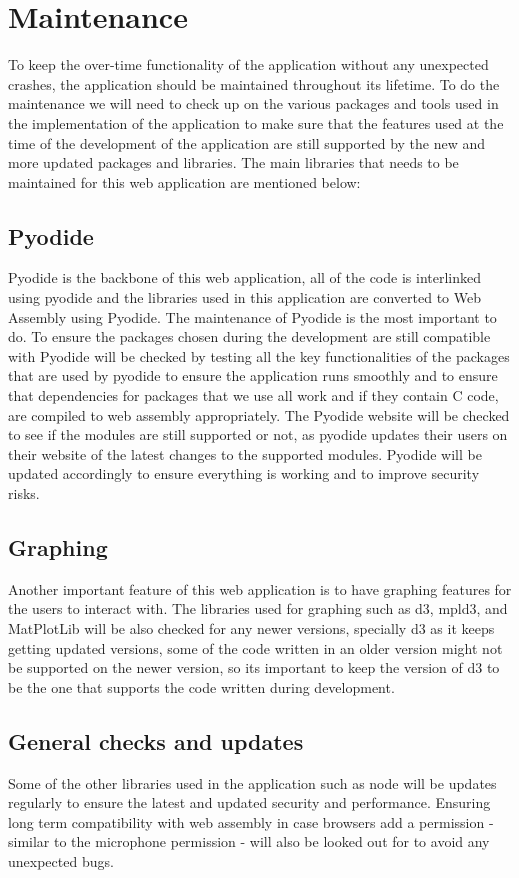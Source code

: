 \section{Maintenance}


To keep the over-time functionality of the application without any unexpected crashes, the application should be maintained throughout its lifetime. 
To do the maintenance we will need to check up on the various packages and tools used in the implementation of the application to make sure that the features used at the time of the development of 
the application are still supported by the new and more updated packages and libraries. The main libraries that needs to be maintained for this web application are mentioned below:
\subsection{Pyodide}

Pyodide is the backbone of this web application, all of the code is interlinked using pyodide and the libraries used in this application are converted to Web Assembly using Pyodide. 
The maintenance of Pyodide is the most important to do. To ensure the packages chosen during the development are still compatible with Pyodide will be checked by testing all the key functionalities 
of the packages that are used by pyodide to ensure the application runs smoothly and to ensure that dependencies for packages that we use all work and if they contain C code, are compiled to web assembly appropriately.
The Pyodide website will be checked to see if the modules are still supported or not, as pyodide updates their users on their website of the latest changes to the supported modules. 
Pyodide will be updated accordingly to ensure everything is working and to improve security risks.

\subsection{Graphing}
Another important feature of this web application is to have graphing features for the users to interact with. 
The libraries used for graphing such as d3, mpld3, and MatPlotLib will be also checked for any newer versions, specially d3 as it keeps getting updated versions, some of the code written in an older version might not 
be supported on the newer version, so its important to keep the version of d3 to be the one that supports the code written during development.
\subsection{General checks and updates}
Some of the other libraries used in the application such as node will be updates regularly to ensure the latest and updated security and performance. 
Ensuring long term compatibility with web assembly in case browsers add a permission - similar to the microphone permission - will also be looked out for to avoid any unexpected bugs.